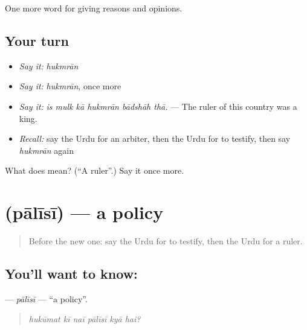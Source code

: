\begin{grammarlens}[title={What you've built}]
One more word for giving reasons and opinions.
\end{grammarlens}

\subsection*{Your turn}
\begin{itemize}
\raggedright
  \item \emph{Say it:} \emph{hukmrān}
  \item \emph{Say it:} \emph{hukmrān}, once more
  \item \emph{Say it:} \emph{is mulk kā hukmrān bādshāh thā.} — The ruler of this country was a king.
  \item \emph{Recall:} say the Urdu for an arbiter, then the Urdu for to testify, then say \emph{hukmrān} again
\end{itemize}

\begin{tcolorbox}[breakable,colback=teal!4,colframe=teal!35!black,title={Before you move on}]
What does  mean? (\textquotedblleft{}A ruler\textquotedblright{}.) Say it once more.
\end{tcolorbox}
\section[\texorpdfstring{\ur{پالیسی} (pālīsī)}{پالیسی (pālīsī)}]{ (pālīsī) — a policy}

\label{lesson:UR-C341-palisi}



\begin{quote}
Before the new one: say the Urdu for to testify, then the Urdu for a ruler.
\end{quote}

\subsection*{You'll want to know: }
\textbf{} — \emph{pālīsī} — \textquotedblleft{}a policy\textquotedblright{}.

\begin{quote}
     
\end{quote}

\begin{quote}
\emph{hukūmat kī naī pālīsī kyā hai?}
\end{quote}

